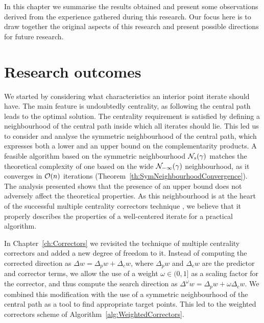 
%
%
\label{ch:Conclusions}

In this chapter we summarise the results obtained and 
present some observations derived from the experience
gathered during this research.
Our focus here is to draw together the original aspects of this research
and present possible directions for future research.

%
%
\section{Research outcomes}

We started by considering what characteristics an interior point iterate
should have. The main feature is undoubtedly centrality, as following
the central path leads to the optimal solution.
The centrality requirement is satisfied by defining a neighbourhood
of the central path inside which all iterates should lie.
This led us to consider and analyse the symmetric neighbourhood
of the central path, which expresses both a lower and an upper bound
on the complementarity products.
A feasible algorithm based on the symmetric neighbourhood $\mathcal{N}_s(\gamma)$
matches the theoretical complexity of one based on the wide
$\mathcal{N}_{-\infty}(\gamma)$ neighbourhood, as it converges
in $\mathcal{O}(n)$ iterations (Theorem~\ref{th:SymNeighbourhoodConvergence}).
The analysis presented shows that the presence of an upper bound does not
adversely affect the theoretical properties.
As this neighbourhood is at the heart of the successful multiple
centrality correctors technique \cite{Gondzio96}, we believe that
it properly describes
the properties of a well-centered iterate for a practical algorithm.

In Chapter~\ref{ch:Correctors} we revisited the 
technique of multiple centrality correctors
and added a new degree of freedom to it. 
Instead of computing the corrected direction as
$\Delta w = \Delta_p w + \Delta_c w$, where 
$\Delta_p w$ and $\Delta_c w$ are the predictor and corrector terms, 
we allow the use of a weight $\omega \in (0,1]$ as a scaling factor
for the corrector, and thus compute the search direction as
$\Delta^\omega w = \Delta_p w + \omega \Delta_c w$.
We combined this modification with the use of a symmetric neighbourhood
of the central path as a tool to find appropriate target points.
This led to the weighted correctors scheme of
Algorithm~\ref{alg:WeightedCorrectors}.

